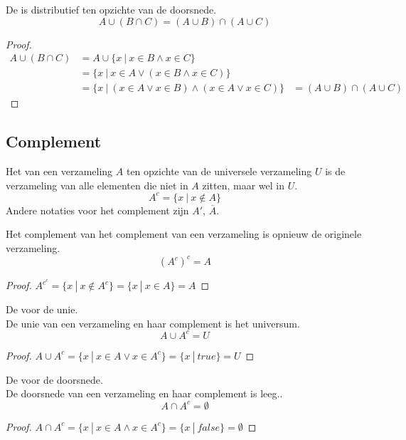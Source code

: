 \documentclass[main.tex]{subfiles}
\begin{document}
\begin{st}
  De  is distributief ten opzichte van de doorsnede.
  \[ A \cup ( B \cap C ) = (A \cup B) \cap (A \cup C) \]

  \begin{proof}
    \[
    \begin{array}{rll}
      A \cup ( B \cap C ) &= A \cup \{ x\ |\ x \in B \wedge x \in C \}&\\
                          &= \{ x\ |\ x \in A \vee (x \in B \wedge x \in C) \}&\\
                          &= \{ x\ |\ (x \in A \vee x\in B) \wedge (x \in A \vee x \in C) \} &= (A \cup B) \cap (A \cup C)      
    \end{array}
    \]
  \end{proof}
\end{st}

\subsection{Complement}
\label{sec:complement}

\begin{de}
  Het  van een verzameling $A$ ten opzichte van de universele verzameling $U$ is de verzameling van alle elementen die niet in $A$ zitten, maar wel in $U$.
  \[ A^{c} = \{ x\ |\ x \not\in A \} \]
  Andere notaties voor het complement zijn $A'$, $\overline{A}$. 
\end{de}

\begin{st}
  Het complement van het complement van een verzameling is opnieuw de originele verzameling.
  \[ (A^{c})^{c} = A\]
  \begin{proof}
    $A^{c^{c}} = \{ x\ |\ x \not\in A^{c} \} = \{ x\ |\ x \in A \} = A$
  \end{proof}
\end{st}

\begin{st}
  De  voor de unie.\\
  De unie van een verzameling en haar complement is het universum.
  \[ A \cup A^{c} = U \]
  \begin{proof}
    $A \cup A^{c} = \{ x\ |\ x \in A \vee x \in A^{c}\} = \{ x\ |\ true \} = U$
  \end{proof}
\end{st}

\begin{st}
  De  voor de doorsnede.\\
  De doorsnede van een verzameling en haar complement is leeg..
  \[ A \cap A^{c} = \emptyset \]

  \begin{proof}
    $A \cap A^{c} = \{ x\ |\ x \in A \wedge x \in A^{c} \} = \{ x\ |\ false \}= \emptyset$
  \end{proof}
\end{st}
\end{document}
